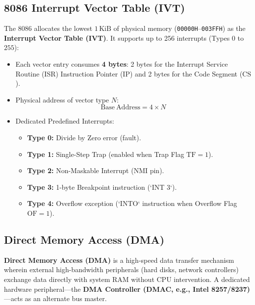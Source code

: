 \documentclass[12pt,a4paper]{article}
\begin{document}
\subsection{8086 Interrupt Vector Table (IVT)}
The 8086 allocates the lowest $1\,\mathrm{KiB}$ of physical memory (\texttt{00000H}--\texttt{003FFH}) as the \textbf{Interrupt Vector Table (IVT)}. It supports up to 256 interrupts (Types $0$ to $255$):
\begin{itemize}[leftmargin=*]
  \item Each vector entry consumes \textbf{4 bytes}: 2 bytes for the Interrupt Service Routine (ISR) Instruction Pointer ($\mathrm{IP}$) and 2 bytes for the Code Segment ($\mathrm{CS}$).
  \item Physical address of vector type $N$:
  \[
  \mathbf{\mathrm{Base\ Address}} = 4 \times N
  \]
  \item Dedicated Predefined Interrupts:
  \begin{itemize}[leftmargin=*]
    \item \textbf{Type 0:} Divide by Zero error (fault).
    \item \textbf{Type 1:} Single-Step Trap (enabled when Trap Flag $\mathrm{TF}=1$).
    \item \textbf{Type 2:} Non-Maskable Interrupt ($\mathrm{NMI}$ pin).
    \item \textbf{Type 3:} 1-byte Breakpoint instruction (`INT 3`).
    \item \textbf{Type 4:} Overflow exception (`INTO` instruction when Overflow Flag $\mathrm{OF}=1$).
  \end{itemize}
\end{itemize}

\subsection{Direct Memory Access (DMA)}
\begin{tcolorbox}[defbox, title={Direct Memory Access (DMA) Principle}]
\textbf{Direct Memory Access (DMA)} is a high-speed data transfer mechanism wherein external high-bandwidth peripherals (hard disks, network controllers) exchange data directly with system RAM without CPU intervention. A dedicated hardware peripheral—the \textbf{DMA Controller (DMAC, e.g., Intel 8257/8237)}—acts as an alternate bus master.
\end{tcolorbox}
\end{document}
